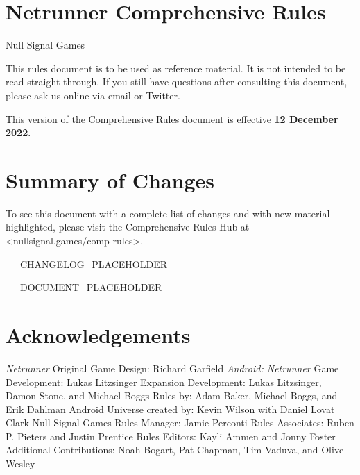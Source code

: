\documentclass{article}
\newcommand{\chapsubhead}[1]{{\Large #1 \vspace{2ex}}}
\begin{document}

\section*{Netrunner Comprehensive Rules}
\chapsubhead{Null Signal Games}

This rules document is to be used as reference material. It is not intended to be read straight through. If you still have questions after consulting this document, please ask us online via email or Twitter.

This version of the Comprehensive Rules document is effective \textbf{12 December 2022}.

\section*{Summary of Changes}

To see this document with a complete list of changes and with new material highlighted, please visit the Comprehensive Rules Hub at <nullsignal.games/comp-rules>.

__CHANGELOG_PLACEHOLDER__


\newpage


\begin{multicols}{2}
  \tableofcontents
\end{multicols}


\newpage


__DOCUMENT_PLACEHOLDER__


\newpage

\section*{Acknowledgements}

\begin{outline}[enumerate]
\1 \emph{Netrunner} Original Game Design: Richard Garfield
\1 \emph{Android: Netrunner}
  \2 Game Development: Lukas Litzsinger
  \2 Expansion Development: Lukas Litzsinger, Damon Stone, and Michael Boggs
  \2 Rules by: Adam Baker, Michael Boggs, and Erik Dahlman
  \2 Android Universe created by: Kevin Wilson with Daniel Lovat Clark
\1 Null Signal Games
  \2 Rules Manager: Jamie Perconti
  \2 Rules Associates: Ruben P. Pieters and Justin Prentice
  \2 Rules Editors: Kayli Ammen and Jonny Foster
  \2 Additional Contributions: Noah Bogart, Pat Chapman, Tim Vaduva, and Olive Wesley
\end{outline}
\end{document}
